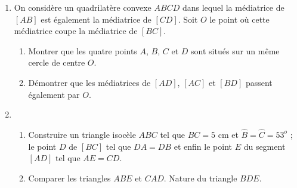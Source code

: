 \documentclass[12 pt]{report}
\theoremstyle{plain}
\newcounter{n}
\begin{document}
\begin{enumerate}
\begin{enumerate}
\end{enumerate}
\item On considère un quadrilatère convexe $ABCD$ dans lequel la médiatrice de 
$[AB]$ est également la médiatrice de $[CD]$. Soit $O$ le point où cette médiatrice coupe la médiatrice de $[BC]$. \begin{enumerate}
\item Montrer que les quatre points $A$, $B$, $C$ et $D$ sont situés sur un même cercle de centre $O$. 
\item Démontrer que les médiatrices de $[AD]$, $[AC]$ et $[BD]$ passent également par $O$. 
\end{enumerate}
\item \begin{enumerate}
\item Construire un triangle isocèle $ABC$ tel que $BC = 5$ cm et $\widehat{B}=\widehat{C}= 53^o$ ; le point $D$ de $[BC]$ tel que $DA=DB$ et enfin le point $E$ 
du segment $[AD]$ tel que $AE=CD$.
\item Comparer les triangles $ABE$ et $CAD$. Nature du triangle $BDE$.
\end{enumerate}
\end{enumerate}
\end{document}
